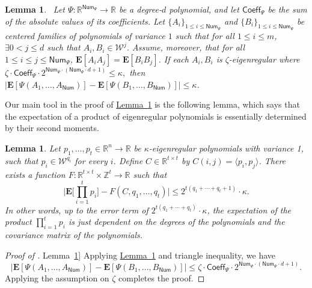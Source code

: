 \documentclass[11pt]{article}
\numberwithin{equation}{section}
\newtheorem{lemma}[theorem]{Lemma}
\theoremstyle{definition}
\theoremstyle{plain}
\newcommand{\expref}[2]{\hyperref[#2]{#1~\ref{#2}}}
\begin{document}
\begin{lemma}~\label{lem:variance-lowerbound}
Let $\Psi:\mathbb{R}^{\mathsf{Num}_\Psi} \rightarrow \mathbb{R}$ be a
degree-$d$ polynomial, and let $\mathsf{Coeff}_\Psi$ be the sum of the absolute
values of its coefficients.
Let $\{A_i\}_{1 \le i \le
\mathsf{Num}_\Psi}$ and $\{B_i \}_{1 \le i \le \mathsf{Num}_\Psi}$  be centered
families of polynomials of variance $1$ such that for all $1 \le i \le m$,
$\exists 0< j \le d$ such that $A_i, B_i \in \mathcal{W}^j$. Assume, moreover, that for all
$1 \le i \le j \le \mathsf{Num}_\Psi$, $\mathbf{E}[A_i A_j] = \mathbf{E}[B_i
B_j]$. If each $A_i, B_i$ is $\zeta$-eigenregular where 
$
\zeta \cdot \mathsf{Coeff}_\Psi \cdot 2^{\mathsf{Num}_\Psi \cdot (\mathsf{Num}_\Psi \cdot d+1)} \leq \kappa, 
$
then $|\mathbf{E}[\Psi(A_1, \ldots, A_{\mathsf{Num}})] - \mathbf{E}[\Psi(B_1, \ldots, B_{\mathsf{Num}})]| \le \kappa$. 
\end{lemma}

Our main tool in the proof of \expref{Lemma}{lem:variance-lowerbound} is the following lemma,
which says that the expectation of a product of eigenregular polynomials is essentially
determined by their second moments.

\begin{lemma}\label{lem:monomial}
    Let $p_1, \ldots, p_t \in \mathbb{R}^n \rightarrow \mathbb{R}$ be $\kappa$-eigenregular polynomials with variance 1, such that $p_i \in \mathcal{W}^{q_i}$ for every $i$.
    Define $C \in \mathbb{R}^{t \times t}$ by $C(i,j) = \langle p_i, p_j \rangle$. 
There exists a function $F : \mathbb{R}^{t \times t} \times \mathbb{Z}^{t} \rightarrow \mathbb{R}$ such that 
\[
\bigg| \mathbf{E}\big[\prod_{i=1}^t p_i \big] - F(C, q_1, \ldots, q_t) \bigg| \le  2^{t (q_1 + \cdots + q_t+1)} \cdot \kappa. 
\]
In other words, up to the error term of $2^{t (q_1 + \cdots + q_t)} \cdot \kappa$, the expectation of the product $\prod_{i=1}^t p_i$ is just dependent on the degrees of the polynomials and the covariance matrix of the polynomials. 
\end{lemma}

\begin{proof}[Proof of \expref{Lemma}{lem:variance-lowerbound}]
Applying \expref{Lemma}{lem:monomial} and triangle inequality, we have
$$
|\mathbf{E}[\Psi(A_1, \ldots, A_{\mathsf{Num}})] - \mathbf{E}[\Psi(B_1, \ldots, B_{\mathsf{Num}})]|  \le \zeta \cdot\mathsf{Coeff}_\Psi \cdot 2^{\mathsf{Num}_\Psi \cdot (\mathsf{Num}_\Psi \cdot d+1)}. 
$$
Applying the assumption on $\zeta$ completes the proof.
\end{proof}
\end{document}
